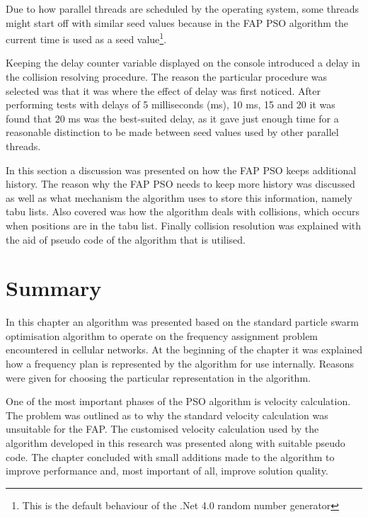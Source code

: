 Due to how parallel threads are scheduled by the operating system, some threads might start off with similar seed values because in  the \gls{FAP} \gls{PSO} algorithm the current time is used as a seed value\footnote{This is the default behaviour of the .Net 4.0 random number generator}.

Keeping the delay counter variable displayed on the console introduced a delay in the collision resolving procedure. The reason the particular procedure was selected was that it was where the effect of delay was first noticed. After performing tests with delays of 5 milliseconds (ms), 10 ms, 15 and 20 it was found that 20 ms was the best-suited delay, as it gave just enough time for a reasonable distinction to be made between seed values used by other parallel threads.

In this section a discussion was presented on how the \gls{FAP} \gls{PSO} keeps additional history. The reason why the \gls{FAP} \gls{PSO} needs to keep more history was discussed as well as what mechanism the algorithm uses to store this information, namely tabu lists. Also covered was how the algorithm deals with collisions, which occurs when positions are in the tabu list. Finally collision resolution was explained with the aid of pseudo code of the algorithm that is utilised.

\section{Summary}
In this chapter an algorithm was presented based on the standard particle swarm optimisation algorithm to operate on the frequency assignment problem encountered in cellular networks. At the beginning of the chapter it was explained how a frequency plan is represented by the algorithm for use internally. Reasons were given for choosing the particular representation in the algorithm.

One of the most important phases of the \gls{PSO} algorithm is velocity calculation. The problem was outlined as to why the standard velocity calculation was unsuitable for the \gls{FAP}. The customised velocity calculation used by the algorithm developed in this research was presented along with suitable pseudo code. The chapter concluded with small additions made to the algorithm to improve performance and, most important of all, improve solution quality.

